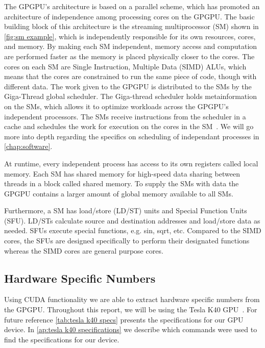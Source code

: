 The GPGPU's architecture is based on a parallel scheme, which has promoted an architecture of independence among processing cores on the GPGPU.
The basic building block of this architecture is the streaming multiprocessor (SM) shown in \cref{fig:sm example}, which is independently responsible for its own resources, cores, and memory.
By making each SM independent, memory access and computation are performed faster as the memory is placed physically closer to the cores.
The cores on each SM are Single Instruction, Multiple Data (SIMD) ALUs, which means that the cores are constrained to run the same piece of code, though with different data.
The work given to the GPGPU is distributed to the SMs by the Giga-Thread global scheduler.
The Giga-thread scheduler holds metainformation on the SMs, which allows it to optimize workloads across the GPGPU's independent processors.
The SMs receive instructions from the scheduler in a cache and schedules the work for execution on the cores in the SM~\cite{farber2011cuda}.
We will go more into depth regarding the specifics on scheduling of independant processes in \cref{chap:software}.

At runtime, every independent process has access to its own registers called local memory.
Each SM has shared memory for high-speed data sharing between threads in a block called shared memory.
To supply the SMs with data the GPGPU contains a larger amount of global memory available to all SMs.

Furthermore, a SM has load/store (LD/ST) units and Special Function Units (SFU).
LD/STs calculate source and destination addresses and load/store data as needed.
SFUs execute special functions, e.g. sin, sqrt, etc.
Compared to the SIMD cores, the SFUs are designed specifically to perform their designated functions whereas the SIMD cores are general purpose cores.~\cite{fermi2009nvidia}


\subsection{Hardware Specific Numbers}
\label{sec:hardware specific numbers}
Using CUDA functionality we are able to extract hardware specific numbers from the GPGPU.
Throughout this report, we will be using the Tesla K40 GPU~\cite{teslak402013nvidia}.
For future reference \cref{tab:tesla k40 specs} presents the specifications for our GPU device.
In \cref{ap:tesla k40 specifications} we describe which commands were used to find the specifications for our device.

